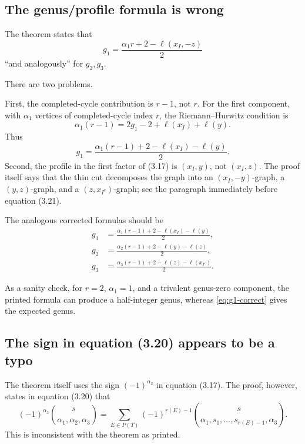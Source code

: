 \documentclass[11pt]{article}
\newcommand{\ellp}{\ell}
\begin{document}
\subsection{The genus/profile formula is wrong}

The theorem states that
\[
   g_1=\frac{\alpha_1 r+2-\ellp(x_I,-z)}{2}
\]
``and analogously'' for $g_2,g_3$.

There are two problems.

First, the completed-cycle contribution is $r-1$, not $r$.  For the first component, with $\alpha_1$ vertices of completed-cycle index $r$, the Riemann--Hurwitz condition is
\[
   \alpha_1(r-1)=2g_1-2+\ellp(x_I)+\ellp(y).
\]
Thus
\begin{equation}\label{eq:g1-correct}
   g_1=\frac{\alpha_1(r-1)+2-\ellp(x_I)-\ellp(y)}{2}.
\end{equation}
Second, the profile in the first factor of (3.17) is $(x_I,y)$, not $(x_I,z)$.  The proof itself says that the thin cut decomposes the graph into an $(x_I,-y)$-graph, a $(y,z)$-graph, and a $(z,x_{I^c})$-graph; see the paragraph immediately before equation (3.21).

The analogous corrected formulas should be
\begin{align}
   g_1&=\frac{\alpha_1(r-1)+2-\ellp(x_I)-\ellp(y)}{2},\\
   g_2&=\frac{\alpha_2(r-1)+2-\ellp(y)-\ellp(z)}{2},\\
   g_3&=\frac{\alpha_3(r-1)+2-\ellp(z)-\ellp(x_{I^c})}{2}.
\end{align}

As a sanity check, for $r=2$, $\alpha_1=1$, and a trivalent genus-zero component, the printed formula can produce a half-integer genus, whereas \eqref{eq:g1-correct} gives the expected genus.

\subsection{The sign in equation (3.20) appears to be a typo}

The theorem itself uses the sign $(-1)^{\alpha_2}$ in equation (3.17).  The proof, however, states in equation (3.20) that
\[
   (-1)^{\alpha_3}\binom{s}{\alpha_1,\alpha_2,\alpha_3}
   =\sum_{E\in P(T)}(-1)^{r(E)-1}
     \binom{s}{\alpha_1,s_1,\ldots,s_{r(E)-1},\alpha_3}.
\]
This is inconsistent with the theorem as printed.
\end{document}
